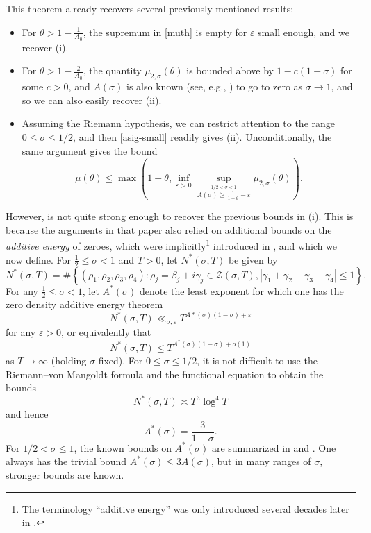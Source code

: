 \documentclass[12pt]{amsart}
\newcommand{\eps}{\varepsilon}
\begin{document}
This theorem already recovers several previously mentioned results:
\begin{itemize}
  \item For $\theta > 1-\frac{1}{A_0}$, the supremum in \eqref{muth} is empty for $\eps$ small enough, and we recover (i).
  \item For $\theta > 1-\frac{2}{A_0}$, the quantity $\mu_{2,\sigma}(\theta)$ is bounded above by $1-c(1-\sigma)$ for some $c>0$, and $A(\sigma)$ is also known (see, e.g., \cite{turan}) to go to zero as $\sigma \to 1$, and so we can also easily recover (ii).
  \item Assuming the Riemann hypothesis, we can restrict attention to the range $0 \leq \sigma \leq 1/2$, and then \eqref{asig-small} readily gives (ii).  Unconditionally, the same argument gives the bound
 \begin{equation}\label{muth-12}
   \mu(\theta) \leq \max \left( 1-\theta, \inf_{\eps>0} \sup_{\stackrel{1/2 < \sigma < 1}{A(\sigma) \geq \frac{1}{1-\theta}-\eps}} \mu_{2,\sigma}(\theta) \right).
 \end{equation}
\end{itemize}

However,  is not quite strong enough to recover the previous bounds in (i).  This is because the arguments in that paper also relied on additional bounds on the \emph{additive energy} of zeroes, which were implicitly\footnote{The terminology ``additive energy'' was only introduced several decades later in \cite{tao-vu}.} introduced in \cite{HB-1}, and which we now define.  For $\frac12 \le \sigma < 1$ and $T>0$, let $N^*(\sigma,T)$ be given by
$$N^*(\sigma, T) =  \#\left\{ (\rho_1, \rho_2, \rho_3, \rho_4) : \rho_j = \beta_j + i\gamma_j\in \mathcal{Z}(\sigma, T), |\gamma_1 + \gamma_2 - \gamma_3 - \gamma_4|\le1 \right\}.$$
 For any $\frac{1}{2} \leq \sigma < 1$, let $A^*(\sigma)$ denote the least exponent for which one has the zero density additive energy theorem
$$N^*(\sigma, T) \ll_{\sigma, \eps} T^{A*(\sigma)(1-\sigma) + \eps}$$
for any $\eps>0$, or equivalently that
$$N^*(\sigma, T) \leq T^{A^*(\sigma)(1-\sigma) + o(1)}$$
as $T \to \infty$ (holding $\sigma$ fixed).  For $0 \leq \sigma \leq 1/2$, it is not difficult to use the Riemann--von Mangoldt formula and the functional equation to obtain the bounds
$$ N^*(\sigma,T) \asymp T^3\log^4 T$$
and hence
$$ A^*(\sigma) = \frac{3}{1-\sigma}.$$
For $1/2 < \sigma\leq 1$, the known bounds on $A^*(\sigma)$ are summarized in  and .  One always has the trivial bound $A^*(\sigma) \leq 3 A(\sigma)$, but in many ranges of $\sigma$, stronger bounds are known.
\end{document}
